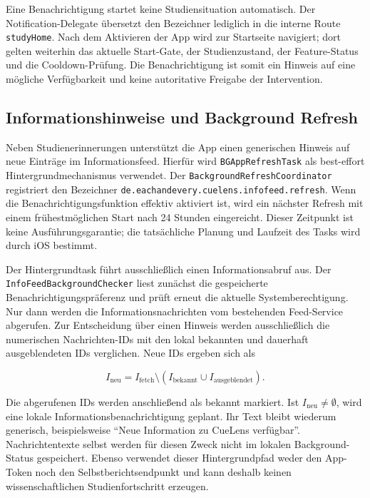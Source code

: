 \begin{neu}
Eine Benachrichtigung startet keine Studiensituation automatisch. Der Notification-Delegate übersetzt den Bezeichner lediglich in die interne Route \texttt{studyHome}. Nach dem Aktivieren der App wird zur Startseite navigiert; dort gelten weiterhin das aktuelle Start-Gate, der Studienzustand, der Feature-Status und die Cooldown-Prüfung. Die Benachrichtigung ist somit ein Hinweis auf eine mögliche Verfügbarkeit und keine autoritative Freigabe der Intervention.

\subsection{Informationshinweise und Background Refresh}

Neben Studienerinnerungen unterstützt die App einen generischen Hinweis auf neue Einträge im Informationsfeed. Hierfür wird \texttt{BGAppRefreshTask} als best-effort Hintergrundmechanismus verwendet. Der \texttt{BackgroundRefreshCoordinator} registriert den Bezeichner \texttt{de.eachandevery.cuelens.infofeed.refresh}. Wenn die Benachrichtigungsfunktion effektiv aktiviert ist, wird ein nächster Refresh mit einem frühestmöglichen Start nach 24 Stunden eingereicht. Dieser Zeitpunkt ist keine Ausführungsgarantie; die tatsächliche Planung und Laufzeit des Tasks wird durch iOS bestimmt.

Der Hintergrundtask führt ausschließlich einen Informationsabruf aus. Der \texttt{InfoFeedBackgroundChecker} liest zunächst die gespeicherte Benachrichtigungspräferenz und prüft erneut die aktuelle Systemberechtigung. Nur dann werden die Informationsnachrichten vom bestehenden Feed-Service abgerufen. Zur Entscheidung über einen Hinweis werden ausschließlich die numerischen Nachrichten-IDs mit den lokal bekannten und dauerhaft ausgeblendeten IDs verglichen. Neue IDs ergeben sich als

\[
I_{\mathrm{neu}}
=
I_{\mathrm{fetch}}
\setminus
\left(I_{\mathrm{bekannt}} \cup I_{\mathrm{ausgeblendet}}\right).
\]

Die abgerufenen IDs werden anschließend als bekannt markiert. Ist \(I_{\mathrm{neu}}\neq\emptyset\), wird eine lokale Informationsbenachrichtigung geplant. Ihr Text bleibt wiederum generisch, beispielsweise \enquote{Neue Information zu CueLens verfügbar}. Nachrichtentexte selbst werden für diesen Zweck nicht im lokalen Background-Status gespeichert. Ebenso verwendet dieser Hintergrundpfad weder den App-Token noch den Selbstberichtsendpunkt und kann deshalb keinen wissenschaftlichen Studienfortschritt erzeugen.


\end{neu}
